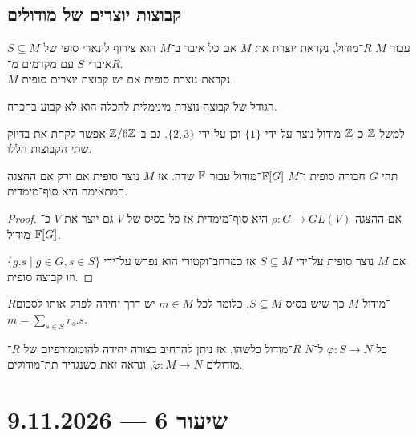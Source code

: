 \subsection{קבוצות יוצרים של מודולים}
\begin{definition}
	$S \subseteq M$ עבור $M$ $R$־מודול, נקראת יוצרת את $M$ אם כל איבר ב־$M$ הוא צירוף לינארי סופי של איברי $S$ עם מקדמים מ־$R$. \\
	$M$ נקראת נוצרת סופית אם יש קבוצת יוצרים סופית.
\end{definition}
\begin{remark}
	הגודל של קבוצה נוצרת מינימלית להכלה הוא לא קבוע בהכרח.
\end{remark}
למשל $\mathbb{Z}$ כ־$\mathbb{Z}$־מודול נוצר על־ידי $\{ 1 \}$ וכן על־ידי $\{2, 3\}$. גם ב־$\mathbb{Z} / 6 \mathbb{Z}$ אפשר לקחת את בדיוק שתי הקבוצות הללו.
\begin{proposition}
	תהי $G$ חבורה סופית ו־$M$ $\mathbb{F}[G]$־מודול עבור $\mathbb{F}$ שדה.
	אז $M$ נוצר סופית אם ורק אם ההצגה המתאימה היא סוף־מימדית.
\end{proposition}
\begin{proof}
	אם ההצגה $\rho : G \to GL(V)$ היא סוף־מימדית אז כל בסיס של $V$ גם יוצר את $V$ כ־$\mathbb{F}[G]$־מודול.

	אם $M$ נוצר סופית על־ידי $S \subseteq M$ אז כמרחב־וקטורי הוא נפרש על־ידי $\{ g . s \mid g \in G, s \in S \}$ וזו קבוצה סופית.
\end{proof}
\begin{definition}
	$R$־מודול $M$ כך שיש בסיס $S \subseteq M$, כלומר לכל $m \in M$ יש דרך יחידה לפרק אותו לסכום $m = \sum_{s \in S} r_s . s$.
\end{definition}
כל $\varphi : S \to N$ ל־$N$ $R$־מודול כלשהו, אז ניתן להרחיב בצורה יחידה להומומורפיזם של $R$־מודולים $\tilde{\varphi} : M \to N$, ונראה זאת כשנגדיר תת־מודולים.

\section{שיעור 6 --- 9.11.2026}
